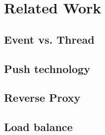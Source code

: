 \section{Related Work\\}

\subsection{Event vs. Thread\\}

\subsection{Push technology\\}

\subsection{Reverse Proxy\\}

\subsection{Load balance\\}

